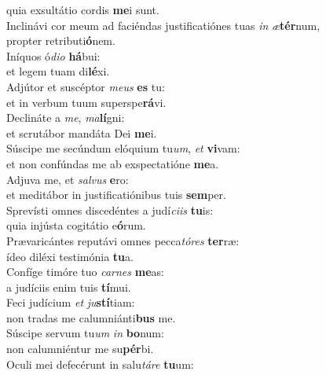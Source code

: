 \oddverse quia exsultátio cordis \textbf{me}i sunt.\\
\evenverse Inclinávi cor meum ad faciéndas justificatiónes tuas \textit{in} \textit{æ}\textbf{tér}num,~\*\\
\evenverse propter retributi\textbf{ó}nem.\\
\oddverse Iníquos ó\textit{di}\textit{o} \textbf{há}bui:~\*\\
\oddverse et legem tuam di\textbf{lé}xi.\\
\evenverse Adjútor et suscéptor \textit{me}\textit{us} \textbf{es} tu:~\*\\
\evenverse et in verbum tuum superspe\textbf{rá}vi.\\
\oddverse Declináte a \textit{me}, \textit{ma}\textbf{lí}gni:~\*\\
\oddverse et scrutábor mandáta Dei \textbf{me}i.\\
\evenverse Súscipe me secúndum elóquium tu\textit{um}, \textit{et} \textbf{vi}vam:~\*\\
\evenverse et non confúndas me ab exspectatióne \textbf{me}a.\\
\oddverse Adjuva me, et \textit{sal}\textit{vus} \textbf{e}ro:~\*\\
\oddverse et meditábor in justificatiónibus tuis \textbf{sem}per.\\
\evenverse Sprevísti omnes discedéntes a judí\textit{ci}\textit{is} \textbf{tu}is:~\*\\
\evenverse quia injústa cogitátio e\textbf{ó}rum.\\
\oddverse Prævaricántes reputávi omnes pecca\textit{tó}\textit{res} \textbf{ter}ræ:~\*\\
\oddverse ídeo diléxi testimónia \textbf{tu}a.\\
\evenverse Confíge timóre tuo \textit{car}\textit{nes} \textbf{me}as:~\*\\
\evenverse a judíciis enim tuis \textbf{tí}mui.\\
\oddverse Feci judícium \textit{et} \textit{ju}\textbf{stí}tiam:~\*\\
\oddverse non tradas me calumniánti\textbf{bus} me.\\
\evenverse Súscipe servum tu\textit{um} \textit{in} \textbf{bo}num:~\*\\
\evenverse non calumniéntur me su\textbf{pér}bi.\\
\oddverse Oculi mei defecérunt in salu\textit{tá}\textit{re} \textbf{tu}um:~\*\\
